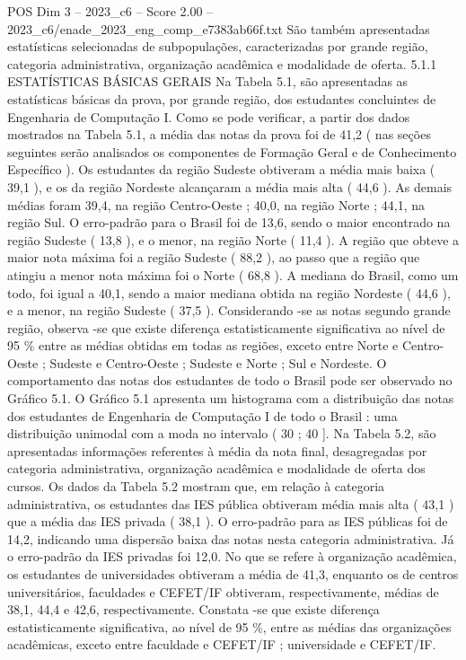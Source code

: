 \begin{textsample}{POS Dim 3 – 2023\_c6 – Score 2.00 – 2023\_c6/enade\_2023\_eng\_comp\_e7383ab66f.txt}
São também apresentadas estatísticas selecionadas de subpopulações, caracterizadas por grande região, categoria administrativa, organização acadêmica e modalidade de oferta. 5.1.1 ESTATÍSTICAS BÁSICAS GERAIS Na Tabela 5.1, são apresentadas as estatísticas básicas da prova, por grande região, dos estudantes concluintes de Engenharia de Computação I.
Como se pode verificar, a partir dos dados mostrados na Tabela 5.1, a média das notas da prova foi de 41,2 ( nas seções seguintes serão analisados os componentes de Formação Geral e de Conhecimento Específico ).
Os estudantes da região Sudeste obtiveram a média mais baixa ( 39,1 ), e os da região Nordeste alcançaram a média mais alta ( 44,6 ).
As demais médias foram 39,4, na região Centro-Oeste ; 40,0, na região Norte ; 44,1, na região Sul.
O erro-padrão para o Brasil foi de 13,6, sendo o maior encontrado na região Sudeste ( 13,8 ), e o menor, na região Norte ( 11,4 ).
A região que obteve a maior nota máxima foi a região Sudeste ( 88,2 ), ao passo que a região que atingiu a menor nota máxima foi o Norte ( 68,8 ).
A mediana do Brasil, como um todo, foi igual a 40,1, sendo a maior mediana obtida na região Nordeste ( 44,6 ), e a menor, na região Sudeste ( 37,5 ).
Considerando -se as notas segundo grande região, observa -se que existe diferença estatisticamente significativa ao nível de 95 \% entre as médias obtidas em todas as regiões, exceto entre Norte e Centro-Oeste ; Sudeste e Centro-Oeste ; Sudeste e Norte ; Sul e Nordeste.
O comportamento das notas dos estudantes de todo o Brasil pode ser observado no Gráfico 5.1.
O Gráfico 5.1 apresenta um histograma com a distribuição das notas dos estudantes de Engenharia de Computação I de todo o Brasil : uma distribuição unimodal com a moda no intervalo ( 30 ; 40 ].
Na Tabela 5.2, são apresentadas informações referentes à média da nota final, desagregadas por categoria administrativa, organização acadêmica e modalidade de oferta dos cursos.
Os dados da Tabela 5.2 mostram que, em relação à categoria administrativa, os estudantes das IES pública obtiveram média mais alta ( 43,1 ) que a média das IES privada ( 38,1 ).
O erro-padrão para as IES públicas foi de 14,2, indicando uma dispersão baixa das notas nesta categoria administrativa.
Já o erro-padrão da IES privadas foi 12,0.
No que se refere à organização acadêmica, os estudantes de universidades obtiveram a média de 41,3, enquanto os de centros universitários, faculdades e CEFET/IF obtiveram, respectivamente, médias de 38,1, 44,4 e 42,6, respectivamente.
Constata -se que existe diferença estatisticamente significativa, ao nível de 95 \%, entre as médias das organizações acadêmicas, exceto entre faculdade e CEFET/IF ; universidade e CEFET/IF.

\end{textsample}
